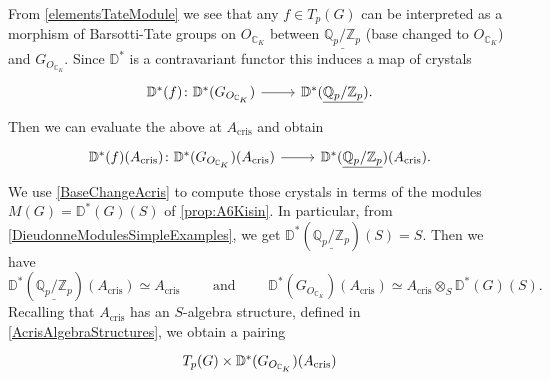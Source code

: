 \begin{rem}[]\label{constr:ComparisonMorphism}
	From \cref{elementsTateModule} we see that any $f \in T_p(G)$
	can be interpreted as a morphism of Barsotti-Tate groups
	on $O_{\mathbb{C}_K}$ between $\underline{\mathbb{Q}_p/\mathbb{Z}_{p}}$
	(base changed to $O_{\mathbb{C}_K}$) and $G_{O_{\mathbb{C}_K}}$.
	Since $\mathbb{D}^*$ is a contravariant functor this induces a map
	of crystals
	\begin{equation*}
	\begin{tikzcd}[row sep = 0ex
		,/tikz/column 1/.append style={anchor=base east}
		,/tikz/column 2/.append style={anchor=base west}]
		\mathbb{D}^*(f)\colon 
		\mathbb{D}^*(G_{O_{\mathbb{C}_K}})\arrow[r, "", rightarrow] &
		\mathbb{D}^*(\underline{\mathbb{Q}_p/\mathbb{Z}_{p}})
	.\end{tikzcd}
	\end{equation*} 
	Then we can evaluate the above at $A_{\mathrm{cris}}$ and obtain
	\begin{equation*}
	\begin{tikzcd}[row sep = 0ex
		,/tikz/column 1/.append style={anchor=base east}
		,/tikz/column 2/.append style={anchor=base west}]
		\mathbb{D}^*(f)(A_{\mathrm{cris}})\colon 
		\mathbb{D}^*(G_{O_{\mathbb{C}_K}})(A_{\mathrm{cris}})
		\arrow[r, "", rightarrow] &
		\mathbb{D}^*(\underline{\mathbb{Q}_p/\mathbb{Z}_{p}})(A_{\mathrm{cris}})
	.\end{tikzcd}
	\end{equation*} 
	We use \cref{BaseChangeAcris} to compute those crystals
	in terms of the modules $M(G) = \mathbb{D}^*(G)(S)$ of \cref{prop:A6Kisin}.
	In particular, from \cref{DieudonneModulesSimpleExamples}, we get
	$\mathbb{D}^*(\underline{\mathbb{Q}_p/\mathbb{Z}_{p}})(S) = S$.
	Then we have
	\begin{equation*}
	\mathbb{D}^*(\underline{\mathbb{Q}_p/\mathbb{Z}_{p}})(A_{\mathrm{cris}})
	\simeq A_{\mathrm{cris}}
	\qquad \text{ and } \qquad
	\mathbb{D}^*(G_{O_{\mathbb{C}_K}})(A_{\mathrm{cris}}) \simeq
	A_{\mathrm{cris}} \otimes_S \mathbb{D}^*(G)(S)
	.\end{equation*}
	Recalling that $A_{\mathrm{cris}}$ has an $S$-algebra structure,
	defined in \cref{AcrisAlgebraStructures}, we obtain a pairing
	\begin{equation*}
	\begin{tikzcd}[row sep = 0ex
		,/tikz/column 1/.append style={anchor=base east}
		,/tikz/column 2/.append style={anchor=base west}]
		T_p(G) \times \mathbb{D}^*(G_{O_{\mathbb{C}_K}})(A_{\mathrm{cris}}) 

\end{tikzcd}
\end{equation*}
\end{rem}
